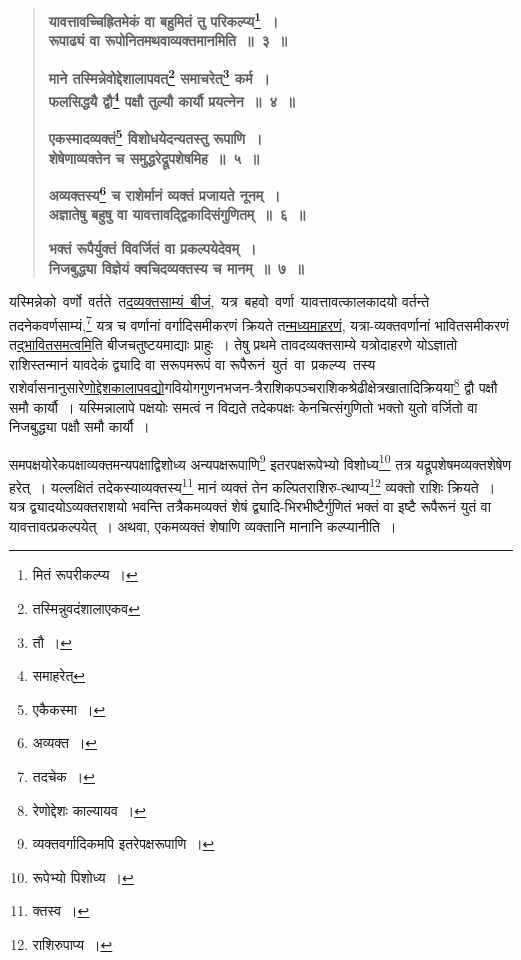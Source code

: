 \documentclass[11pt, openany]{book}
\begin{document}
\begin{quote}
\textbf{{\color{purple}यावत्तावच्चिह्रितमेकं वा बहुमितं तु परिकल्प्य\renewcommand{\thefootnote}{५}\footnote{मितं रूपरीकल्प्य~।}~। \\
रूपाढ्यं वा रूपोनितमथवाव्यक्तमानमिति~॥~३~॥}}
\vspace{1mm}

 \label{4b}
\textbf{{\color{purple}माने तस्मिन्नेवोद्देशालापवत्\renewcommand{\thefootnote}{६}\footnote{तस्मिन्नुवदंशालाएकव} समाचरेत्\renewcommand{\thefootnote}{७}\footnote{तौ~।} कर्म~। \\
फलसिद्धयै द्वौ\renewcommand{\thefootnote}{८}\footnote{समाहरेत्} पक्षौ तुल्यौ कार्यौ प्रयत्नेन~॥~४~॥}}
\vspace{1mm}

\textbf{{\color{purple}एकस्मादव्यक्तं\renewcommand{\thefootnote}{९}\footnote{एकैकस्मा~।} विशोधयेदन्यतस्तु रूपाणि~। \\
शेषेणाव्यक्तेन च समुद्धरेद्रूपशेषमिह~॥~५~॥}}
\vspace{1mm}

\textbf{{\color{purple}अव्यक्तस्य\renewcommand{\thefootnote}{१०}\footnote{अव्यक्त~।} च राशेर्मानं व्यक्तं प्रजायते नूनम्~। \\
अज्ञातेषु बहुषु वा यावत्तावद्द्विकादिसंगुणितम्~॥~६~॥}}
\vspace{1mm}

\textbf{{\color{purple}भक्तं रूपैर्युक्तं विवर्जितं वा प्रकल्पयेदेवम्~। \\
निजबुद्ध्या विज्ञेयं क्वचिदव्यक्तस्य च मानम्~॥~७~॥}}
\end{quote}

यस्मिन्नेको \,वर्णो \,वर्तते \,त\hyperref[1b]{दव्यक्तसाम्यं \,बीजं}, \,यत्र \,बहवो \,वर्णा \,यावत्तावत्कालकादयो वर्तन्ते तदनेकवर्णसाम्यं,\renewcommand{\thefootnote}{११}\footnote{तदचेक~।} यत्र च वर्णानां वर्गादिसमीकरणं क्रियते त\hyperref[2b]{न्मध्यमाहरणं}, यत्रा-व्यक्तवर्णानां भावितसमीकरणं त\hyperref[2b]{द्भावितसमत्वमि}ति बीजचतुष्टयमाद्याः प्राहुः~। तेषु प्रथमे तावदव्यक्तसाम्ये यत्रोदाहरणे योऽज्ञातो राशिस्तन्मानं यावदेकं द्व्यादि वा सरूपमरूपं वा रूपैरूनं \,युतं \,वा \,प्रकल्प्य \,तस्य \,राशेर्वासनानुसारे\hyperref[4b]{णोद्देशकालापवद्यो}गवियोगगुणनभजन-त्रैराशिकपञ्चराशिकश्रेढीक्षेत्रखातादिक्रियया\renewcommand{\thefootnote}{१२}\footnote{रेणोद्देशः काल्यायव~।} द्वौ पक्षौ समौ कार्यौ~। यस्मिन्नालापे पक्षयोः समत्वं न विद्यते तदेकपक्षः केनचित्संगुणितो भक्तो युतो वर्जितो वा निजबुद्ध्या पक्षौ समौ कार्यौ~। 

\newpage

\noindent समपक्षयोरेकपक्षाव्यक्तमन्यपक्षाद्विशोध्य अन्यपक्षरूपाणि\renewcommand{\thefootnote}{१}\footnote{व्यक्तवर्गादिकमपि इतरेपक्षरूपाणि~।} इतरपक्षरूपेभ्यो विशोध्य\renewcommand{\thefootnote}{२}\footnote{रूपेभ्यो पिशोध्य~।} तत्र यद्रूपशेषमव्यक्तशेषेण हरेत्~। यल्लक्षितं तदेकस्याव्यक्तस्य\renewcommand{\thefootnote}{३}\footnote{क्तस्व~।} मानं व्यक्तं तेन कल्पितराशिरु-त्थाप्य\renewcommand{\thefootnote}{४}\footnote{राशिरुपाप्य~।} व्यक्तो राशिः क्रियते~। यत्र द्व्यादयोऽव्यक्तराशयो भवन्ति तत्रैकमव्यक्तं शेषं द्व्यादि-भिरभीष्टैर्गुणितं भक्तं वा इष्टै रूपैरूनं युतं वा यावत्तावत्प्रकल्पयेत्~। अथवा, एकमव्यक्तं शेषाणि व्यक्तानि मानानि कल्प्यानीति~।\\
\end{document}
